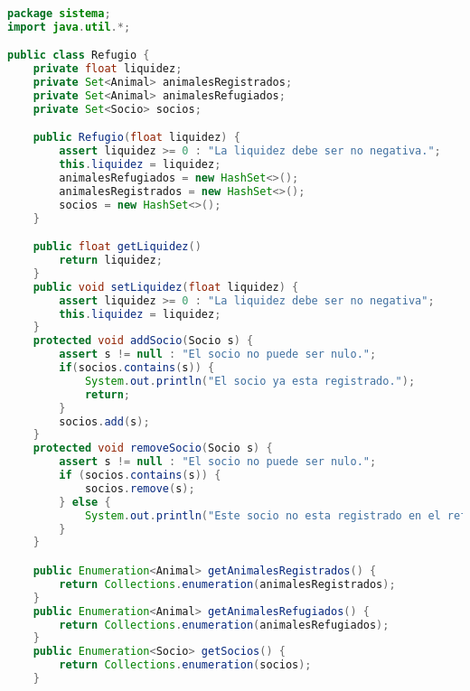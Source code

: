 \begin{lstlisting}[style = javaNormal, language=Java] 
package sistema;
import java.util.*;

public class Refugio {
    private float liquidez;
    private Set<Animal> animalesRegistrados;
    private Set<Animal> animalesRefugiados;
    private Set<Socio> socios;

    public Refugio(float liquidez) {
        assert liquidez >= 0 : "La liquidez debe ser no negativa.";
        this.liquidez = liquidez;
        animalesRefugiados = new HashSet<>();
        animalesRegistrados = new HashSet<>();
        socios = new HashSet<>();
    }

    public float getLiquidez() 
        return liquidez;
    }
    public void setLiquidez(float liquidez) {
        assert liquidez >= 0 : "La liquidez debe ser no negativa";
        this.liquidez = liquidez;
    }
    protected void addSocio(Socio s) {
        assert s != null : "El socio no puede ser nulo.";
        if(socios.contains(s)) {
            System.out.println("El socio ya esta registrado.");
            return;
        }
        socios.add(s);
    }
    protected void removeSocio(Socio s) {
        assert s != null : "El socio no puede ser nulo.";
        if (socios.contains(s)) {
            socios.remove(s);
        } else {
            System.out.println("Este socio no esta registrado en el refugio.");
        }
    }

    public Enumeration<Animal> getAnimalesRegistrados() {
        return Collections.enumeration(animalesRegistrados);
    }
    public Enumeration<Animal> getAnimalesRefugiados() {
        return Collections.enumeration(animalesRefugiados);
    }
    public Enumeration<Socio> getSocios() {
        return Collections.enumeration(socios);
    }


\end{lstlisting}
